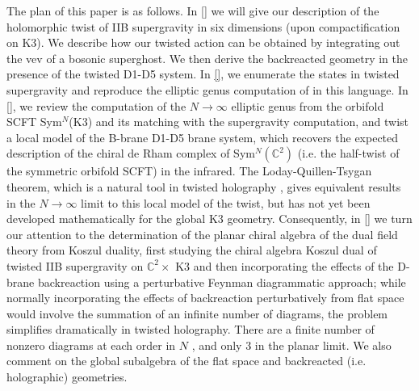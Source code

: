 \documentclass[11pt]{amsart}
\begin{document}
The plan of this paper is as follows. In \ref{} we will give our description of the holomorphic twist of IIB supergravity in six dimensions (upon compactification on K3). We describe how our twisted action can be obtained by integrating out the vev of a bosonic superghost. We then derive the backreacted geometry in the presence of the twisted D1-D5 system. In \ref{}, we enumerate the states in twisted supergravity and reproduce the elliptic genus computation of \cite{} in this language. In \ref{}, we review the computation of the $N \rightarrow \infty$ elliptic genus from the orbifold SCFT Sym$^N$(K3) and its matching with the supergravity computation, and twist a local model of the B-brane D1-D5 brane system, which recovers the expected description of the chiral de Rham complex of Sym$^N(\mathbb{C}^2)$ (i.e. the half-twist of the symmetric orbifold SCFT) in the infrared. The Loday-Quillen-Tsygan theorem, which is a natural tool in twisted holography \cite{}, gives equivalent results in the $N \rightarrow \infty$ limit to this local model of the twist, but has not yet been developed mathematically for the global K3 geometry. Consequently, in \ref{} we turn our attention to the determination of the planar chiral algebra of the dual field theory from Koszul duality, first studying the chiral algebra Koszul dual of twisted IIB supergravity on $\mathbb{C}^2 \times$ K3 and then incorporating the effects of the D-brane backreaction using a perturbative Feynman diagrammatic approach; while normally incorporating the effects of backreaction perturbatively from flat space would involve the summation of an infinite number of diagrams, the problem simplifies dramatically in twisted holography. There are a finite number of nonzero diagrams at each order in $N$ \cite{}, and only 3 in the planar limit. We also comment on the global subalgebra of the flat space and backreacted (i.e. holographic) geometries.

















\end{document}
